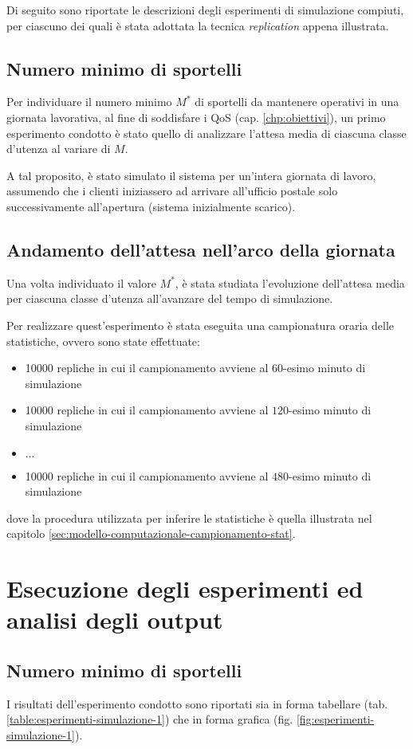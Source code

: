 Di seguito sono riportate le descrizioni degli esperimenti di simulazione compiuti, per ciascuno dei quali è stata adottata la tecnica \textit{replication} appena illustrata.

\subsection*{Numero minimo di sportelli}
Per individuare il numero minimo $M^*$ di sportelli da mantenere operativi in una giornata lavorativa, al fine di soddisfare i QoS (cap. \ref{chp:obiettivi}), un primo esperimento condotto è stato quello di analizzare l'attesa media di ciascuna classe d'utenza al variare di $M$.

A tal proposito, è stato simulato il sistema per un'intera giornata di lavoro, assumendo che i clienti iniziassero ad arrivare all'ufficio postale solo successivamente all'apertura (sistema inizialmente scarico).

\subsection*{Andamento dell'attesa nell'arco della giornata}
Una volta individuato il valore $M^*$, è stata studiata l'evoluzione dell'attesa media per ciascuna classe d'utenza all'avanzare del tempo di simulazione.

Per realizzare quest'esperimento è stata eseguita una campionatura oraria delle statistiche, ovvero sono state effettuate:
\begin{itemize}
\item 10000 repliche in cui il campionamento avviene al $60$-esimo minuto di simulazione
\item 10000 repliche in cui il campionamento avviene al $120$-esimo minuto di simulazione
\item $\dots$
\item 10000 repliche in cui il campionamento avviene al $480$-esimo minuto di simulazione
\end{itemize}
dove la procedura utilizzata per inferire le statistiche è quella illustrata nel capitolo \ref{sec:modello-computazionale-campionamento-stat}.
	
\section{Esecuzione degli esperimenti ed analisi degli output}
\subsection*{Numero minimo di sportelli}
I risultati dell'esperimento condotto sono riportati sia in forma tabellare (tab. \ref{table:esperimenti-simulazione-1}) che in forma grafica (fig. \ref{fig:esperimenti-simulazione-1}).

